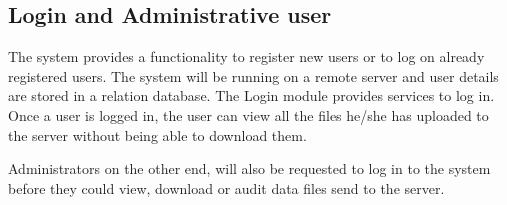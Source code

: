 \documentclass[a4paper,12pt]{article}
\begin{document}
\subsection{Login and Administrative user}
The system provides a functionality to register new users or to log on already registered users. 
The system will be running on a remote server and user details are stored in a relation database.\newline
The Login module provides services to log in. Once a user is logged in, the user can view all the files he/she has uploaded to the server without being able to download them.\newline

Administrators on the other end, will also be requested to log in to the system before they could view, download or audit data files send to the server. 
 
\end{document}
